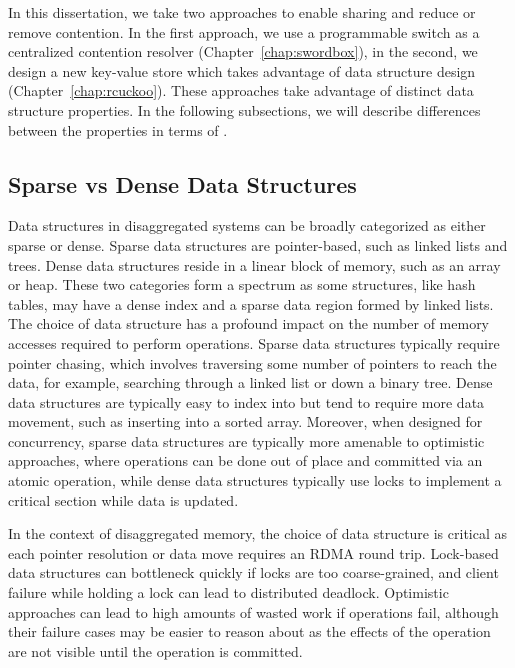 \documentclass[12pt]{ucsddissertation}
\begin{document}
In this dissertation, we take two approaches to enable sharing and reduce or remove contention. In
the first approach, we use a programmable switch as a centralized contention resolver
(Chapter~\ref{chap:swordbox}), in the second, we design a new key-value store which takes advantage
of data structure design (Chapter~\ref{chap:rcuckoo}). These approaches take advantage of distinct
data structure properties. In the following subsections, we will describe differences between the
properties in terms of .



\subsection{Sparse vs Dense Data Structures}
\label{sec:sparse-dense}


Data structures in disaggregated systems can be broadly categorized as either sparse or dense.
Sparse data structures are pointer-based, such as linked lists and trees. Dense data structures
reside in a linear block of memory, such as an array or heap. These two categories form a spectrum
as some structures, like hash tables, may have a dense index and a sparse data region formed by
linked lists. The choice of data structure has a profound impact on the number of memory accesses
required to perform operations. Sparse data structures typically require pointer chasing, which
involves traversing some number of pointers to reach the data, for example, searching through a
linked list or down a binary tree. Dense data structures are typically easy to index into but tend
to require more data movement, such as inserting into a sorted array. Moreover, when designed for
concurrency, sparse data structures are typically more amenable to optimistic approaches, where
operations can be done out of place and committed via an atomic operation, while dense data
structures typically use locks to implement a critical section while data is updated.

In the context of disaggregated memory, the choice of data structure is critical as each pointer
resolution or data move requires an RDMA round trip. Lock-based data structures can bottleneck
quickly if locks are too coarse-grained, and client failure while holding a lock can lead to
distributed deadlock. Optimistic approaches can lead to high amounts of wasted work if operations
fail, although their failure cases may be easier to reason about as the effects of the operation are
not visible until the operation is committed.
\end{document}
